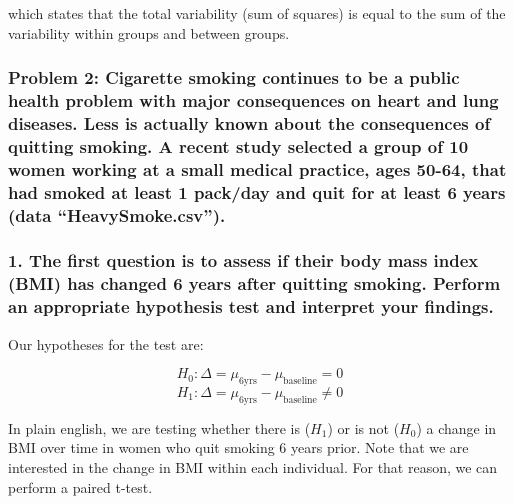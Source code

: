 \documentclass[]{article}
\begin{document}
which states that the total variability (sum of squares) is equal to the
sum of the variability within groups and between groups.

\newpage

\subsubsection{\texorpdfstring{Problem 2: Cigarette smoking continues to
be a public health problem with major consequences on heart and lung
diseases. Less is actually known about the consequences of quitting
smoking. A recent study selected a group of 10 women working at a small
medical practice, ages 50-64, that had smoked at least 1 pack/day and
quit for at least 6 years (data
``HeavySmoke.csv'').}{Problem 2: Cigarette smoking continues to be a public health problem with major consequences on heart and lung diseases. Less is actually known about the consequences of quitting smoking. A recent study selected a group of 10 women working at a small medical practice, ages 50-64, that had smoked at least 1 pack/day and quit for at least 6 years (data HeavySmoke.csv).}}\label{problem-2-cigarette-smoking-continues-to-be-a-public-health-problem-with-major-consequences-on-heart-and-lung-diseases.-less-is-actually-known-about-the-consequences-of-quitting-smoking.-a-recent-study-selected-a-group-of-10-women-working-at-a-small-medical-practice-ages-50-64-that-had-smoked-at-least-1-packday-and-quit-for-at-least-6-years-data-heavysmoke.csv.}

\subsubsection{1. The first question is to assess if their body mass
index (BMI) has changed 6 years after quitting smoking. Perform an
appropriate hypothesis test and interpret your
findings.}\label{the-first-question-is-to-assess-if-their-body-mass-index-bmi-has-changed-6-years-after-quitting-smoking.-perform-an-appropriate-hypothesis-test-and-interpret-your-findings.}

Our hypotheses for the test are:

\[H_0: \Delta = \mu_{\text{6yrs}} - \mu_{\text{baseline}} = 0\]
\[H_1: \Delta = \mu_{\text{6yrs}} - \mu_{\text{baseline}} \neq 0\]

In plain english, we are testing whether there is (\(H_1\)) or is not
(\(H_0\)) a change in BMI over time in women who quit smoking 6 years
prior. Note that we are interested in the change in BMI within each
individual. For that reason, we can perform a paired t-test.
\end{document}
